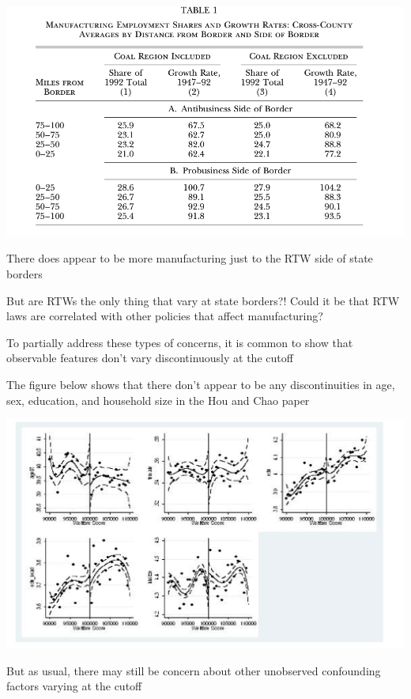 \documentclass[11pt,english,handout]{beamer}
\newenvironment{wideitemize}{\itemize\addtolength{\itemsep}{10pt}}{\enditemize}
\begin{document}
\begin{frame}
\begin{center}
	\includegraphics[width = 0.75 \linewidth]{rtw-results}
\end{center}
	\begin{wideitemize}
		\item
		There does appear to be more manufacturing just to the RTW side of state borders
		
		\pause
		\item
		But are RTWs the only thing that vary at state borders?! Could it be that RTW laws are correlated with other policies that affect manufacturing?
	\end{wideitemize}
\end{frame}

\begin{frame}
	\begin{wideitemize}
		\item
		To partially address these types of concerns, it is common to show that observable features don't vary discontinuously at the cutoff
		
		\pause
		\item
		The figure below shows that there don't appear to be any discontinuities in age, sex, education, and household size in the Hou and Chao paper
		
	\end{wideitemize}	
	\centering
	\includegraphics[width = 0.7 \linewidth]{hou-balance}

	\pause
	\begin{wideitemize}
		\item
		But as usual, there may still be concern about other unobserved confounding factors varying at the cutoff
	\end{wideitemize}
\end{frame}
\end{document}
